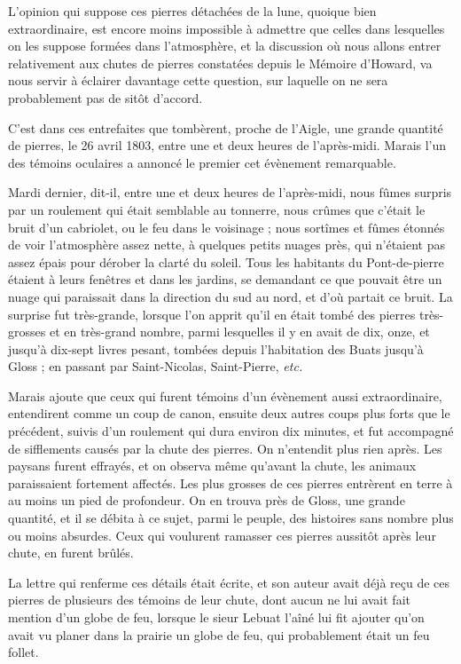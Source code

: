\documentclass[a4paper, 12pt, oneside, french]{article}
\begin{document}
L'opinion qui suppose ces pierres détachées de la lune, quoique bien extraordinaire, est encore moins impossible à admettre que celles dans lesquelles on les suppose formées dans l'atmosphère, et la discussion où nous allons entrer relativement aux chutes de pierres constatées depuis le Mémoire d'Howard, va nous servir à éclairer davantage cette question, sur laquelle on ne sera probablement pas de sitôt d'accord.

C'est dans ces entrefaites que tombèrent, proche de l'Aigle, une grande quantité de pierres, le 26 avril 1803, entre une et deux heures de l'après-midi. Marais l'un des témoins oculaires a annoncé le premier cet évènement remarquable.

\og Mardi dernier, dit-il, entre une et deux heures de l'après-midi, nous fûmes surpris par un roulement qui était semblable au tonnerre, nous crûmes que c'était le bruit d'un cabriolet, ou le feu dans le voisinage ; nous sortîmes et fûmes étonnés de voir l'atmosphère assez nette, à quelques petits nuages près, qui n'étaient pas assez épais pour dérober la clarté du soleil. Tous les habitants du Pont-de-pierre étaient à leurs fenêtres et dans les jardins, se demandant ce que pouvait être un nuage qui paraissait dans la direction du sud au nord, et d'où partait ce bruit. La surprise fut très-grande, lorsque l'on apprit qu'il en était tombé des pierres très-grosses et en très-grand nombre, parmi lesquelles il y en avait de dix, onze, et jusqu'à dix-sept livres pesant, tombées depuis l'habitation des Buats jusqu'à Gloss ; en passant par Saint-Nicolas, Saint-Pierre, \emph{etc.} \fg

Marais ajoute que ceux qui furent témoins d'un évènement aussi extraordinaire, entendirent comme un coup de canon, ensuite deux autres coups plus forts que le précédent, suivis d'un roulement qui dura environ dix minutes, et fut accompagné de sifflements causés par la chute des pierres. On n'entendit plus rien après. Les paysans furent effrayés, et on observa même qu'avant la chute, les animaux paraissaient fortement affectés. Les plus grosses de ces pierres entrèrent en terre à au moins un pied de profondeur. On en trouva près de Gloss, une grande quantité, et il se débita à ce sujet, parmi le peuple, des histoires sans nombre plus ou moins absurdes. Ceux qui voulurent ramasser ces pierres aussitôt après leur chute, en furent brûlés.

La lettre qui renferme ces détails était écrite, et son auteur avait déjà reçu de ces pierres de plusieurs des témoins de leur chute, dont aucun ne lui avait fait mention d'un globe de feu, lorsque le sieur Lebuat l'aîné lui fit ajouter qu'on avait vu planer dans la prairie un globe de feu, qui probablement était un feu follet.
\end{document}
